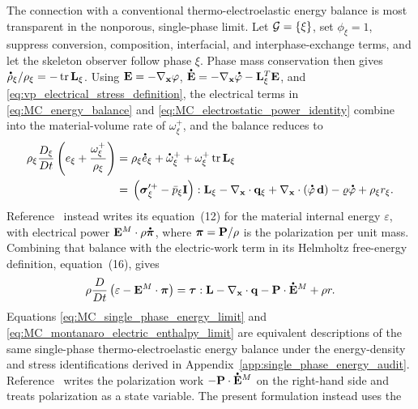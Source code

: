 The connection with a conventional thermo-electroelastic energy balance is most
transparent in the nonporous, single-phase limit.  Let
\(\mathcal{G}=\{\xi\}\), set \(\phi_\xi=1\), suppress conversion, composition,
interfacial, and interphase-exchange terms, and let the skeleton observer follow
phase \(\xi\).  Phase mass conservation then gives
\(\phasedot\rho_\xi/\rho_\xi=-\operatorname{tr}\mbf L_\xi\).  Using
\(\mathbf{E}=-\nabla_{\mathbf{x}}\varphi\),
\(\phasedot{\mbf E}=-\nabla_{\mbf x}\phasedot\varphi-\mbf L_\xi^T\mbf E\), and
\eqref{eq:vp_electrical_stress_definition}, the electrical terms in
\eqref{eq:MC_energy_balance} and
\eqref{eq:MC_electrostatic_power_identity} combine into the material-volume
rate of \(\omega_\xi^+\), and the balance reduces to
%
\begin{align}
	\rho_\xi
	\frac{D_\xi}{Dt}
	\left(
	e_\xi+\frac{\omega_\xi^+}{\rho_\xi}
	\right)
	={} &
	\rho_\xi\phasedot e_\xi
	+
	\phasedot\omega_\xi^+
	+
	\omega_\xi^+\operatorname{tr}\mbf L_\xi
	\notag \\
	={} &
	\left(
	\bs\sigma_\xi^{\prime+}
	-
	\bar p_\xi\mbf I
		\right):\mbf L_\xi
		-
		\nabla_{\mbf x}\cdot\mbf q_\xi
		+
		\nabla_{\mbf x}\cdot
		\left(
		\phasedot\varphi\,\mbf d
		\right)
		-
		\varrho\phasedot\varphi
		+
		\rho_\xi r_\xi .
	\label{eq:MC_single_phase_energy_limit}
\end{align}
%
Reference~\cite{montanaro2015thermo_electroelasticity} instead writes its
equation~(12) for the material internal energy \(\varepsilon\), with electrical
power \(\mbf E^{M}\cdot\rho\phasedot{\bs\pi}\), where
\(\boldsymbol{\pi}=\mathbf{P}/\rho\) is the polarization per unit mass.  Combining that
balance with the electric-work term in its Helmholtz free-energy definition,
equation~(16), gives
%
\begin{equation}
	\rho
	\frac{D}{Dt}
	\left(
	\varepsilon-\mbf E^{M}\cdot\bs\pi
	\right)
	=
	\bs\tau:\mbf L
	-
	\nabla_{\mbf x}\cdot\mbf q
	-
	\mbf P\cdot\phasedot{\mbf E}^{M}
	+
	\rho r .
	\label{eq:MC_montanaro_electric_enthalpy_limit}
\end{equation}
%
Equations \eqref{eq:MC_single_phase_energy_limit} and
\eqref{eq:MC_montanaro_electric_enthalpy_limit} are equivalent descriptions of
the same single-phase thermo-electroelastic energy balance under the
energy-density and stress identifications derived in
Appendix~\ref{app:single_phase_energy_audit}.
Reference~\cite{montanaro2015thermo_electroelasticity} writes the polarization
work \(-\mbf P\cdot\phasedot{\mbf E}^{M}\) on the right-hand side and treats
polarization as a state variable.  The present formulation instead uses the
